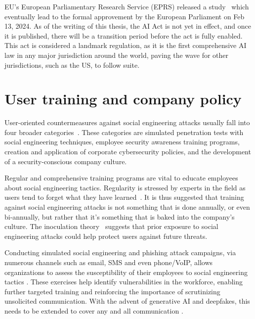 EU's European Parliamentary Research Service (EPRS) released a study~\citep{european_parliamentary_research_service_impact_2020} which eventually lead to the formal approvement by the European Parliament on Feb 13, 2024. As of the writing of this thesis, the AI Act is not yet in effect, and once it is published, there will be a transition period before the act is fully enabled. This act is considered a landmark regulation, as it is the first comprehensive AI law in any major jurisdiction around the world, paving the wave for other jurisdictions, such as the US,  to follow suite.

    


\section{User training and company policy}
\begin{comment}
    - VoIP has been defined before 
\end{comment}


User-oriented countermeasures against social engineering attacks usually fall into four broader categories~\citep{tsinganos_Towards_Automated_Recognition_Chat_SE_Enterprise_2018, mitnick_The_Art_of_Deception_2003}. These categories are simulated penetration tests with social engineering techniques, employee security awareness training programs, creation and application of corporate cybersecurity policies, and the development of a security-conscious company culture.

Regular and comprehensive training programs are vital to educate employees about social engineering tactics. Regularity is stressed by experts in the field as users tend to forget what they have learned~\citep{hadnagy_Social_Engineering_The_Science_2018, mitnick_The_Art_of_Deception_2003}. It is thus suggested that training against social engineering attacks is not something that is done annually, or even bi-annually, but rather that it's something that is baked into the company's culture. The inoculation theory~\citep{blauth_AI_Crime_Overview_Malicious_Use_Abuse_2022} suggests that prior exposure to social engineering attacks could help protect users against future threats.

Conducting simulated social engineering and phishing attack campaigns, via numerous channels such as email, SMS and even phone/VoIP, allows organizations to assess the susceptibility of their employees to social engineering tactics \citep{hadnagy_Social_Engineering_The_Science_2018}. These exercises help identify vulnerabilities in the workforce, enabling further targeted training and reinforcing the importance of scrutinizing unsolicited communication. With the advent of generative AI and deepfakes, this needs to be extended to cover any and all communication \citep{mirsky_Creation_Detection_Deepfakes_2021}.


